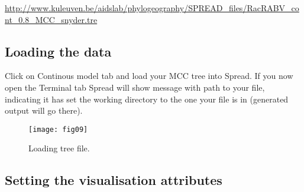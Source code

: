 \url{http://www.kuleuven.be/aidslab/phylogeography/SPREAD_files/RacRABV_cont_0.8_MCC_snyder.tre}


\subsection{Loading the data}

Click on Continous model tab and load your MCC tree into Spread. If
you now open the Terminal tab Spread will show message with path to
your file, indicating it has set the working directory to the one
your file is in (generated output will go there).

\begin{figure}[H]
\begin{centering}
\texttt{[image: fig09]}
\caption{Loading tree file.}
\label{fig:09}
\par\end{centering}
\end{figure}

\subsection{Setting the visualisation attributes}

